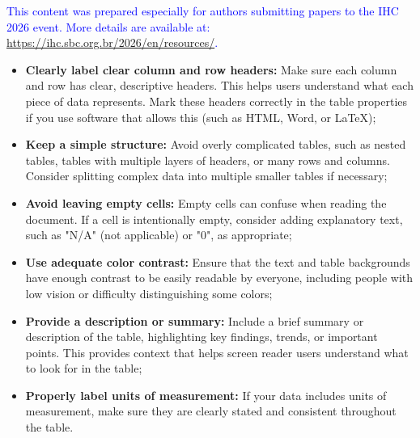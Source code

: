 \documentclass[12pt]{article}
\begin{document}
\textcolor{blue}{This content was prepared especially for authors submitting papers to the IHC 2026 event. More details are available at: \url{https://ihc.sbc.org.br/2026/en/resources/}.}

\begin{itemize}
    \item \textbf{Clearly label clear column and row headers:} Make sure each column and row has clear, descriptive headers. This helps users understand what each piece of data represents. Mark these headers correctly in the table properties if you use software that allows this (such as HTML, Word, or LaTeX);
    \item \textbf{Keep a simple structure:} Avoid overly complicated tables, such as nested tables, tables with multiple layers of headers, or many rows and columns. Consider splitting complex data into multiple smaller tables if necessary;
    \item \textbf{Avoid leaving empty cells:} Empty cells can confuse when reading the document. If a cell is intentionally empty, consider adding explanatory text, such as "N/A" (not applicable) or "0", as appropriate;
    \item \textbf{Use adequate color contrast:} Ensure that the text and table backgrounds have enough contrast to be easily readable by everyone, including people with low vision or difficulty distinguishing some colors;
    \item \textbf{Provide a description or summary:} Include a brief summary or description of the table, highlighting key findings, trends, or important points. This provides context that helps screen reader users understand what to look for in the table;
    \item \textbf{Properly label units of measurement:} If your data includes units of measurement, make sure they are clearly stated and consistent throughout the table.
\end{itemize}
\end{document}
